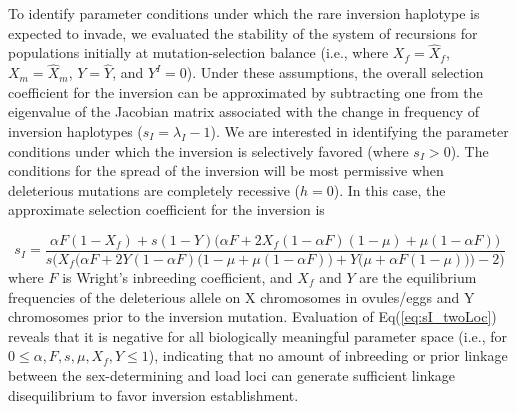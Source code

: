\documentclass{article}
\begin{document}
\begin{appendices}
To identify parameter conditions under which the rare inversion haplotype is expected to invade, we evaluated the stability of the system of recursions for populations initially at mutation-selection balance (i.e., where $X_f=\hat{X}_f$, $X_m=\hat{X}_m$, $Y=\hat{Y}$, and $Y^I=0$). Under these assumptions, the overall selection coefficient for the inversion can be approximated by subtracting one from the eigenvalue of the Jacobian matrix associated with the change in frequency of inversion haplotypes ($s_I = \lambda_I - 1$). We are interested in identifying the parameter conditions under which the inversion is selectively favored (where $s_I > 0$). The conditions for the spread of the inversion will be most permissive when deleterious mutations are completely recessive ($h = 0$). In this case, the approximate selection coefficient for the inversion is

\begin{equation} \label{eq:sI_twoLoc}
	s_I = \frac{\alpha F (1 - X_f) + s(1 - Y) \big( \alpha F + 2 X_f(1 - \alpha F)(1 - \mu) + \mu(1 - \alpha F) \big)} {s \bigg(X_f \Big(\alpha F + 2 Y (1-\alpha F) \big(1 - \mu + \mu (1-\alpha F) \big) + Y \big(\mu+\alpha F(1-\mu) \big) \Big)-2 \bigg)}
\end{equation}
where $F$ is Wright's inbreeding coefficient, and $X_f$ and $Y$ are the equilibrium frequencies of the deleterious allele on X chromosomes in ovules/eggs and Y chromosomes prior to the inversion mutation. Evaluation of Eq(\ref{eq:sI_twoLoc}) reveals that it is negative for all biologically meaningful parameter space (i.e., for $0 \leq  \alpha,F,s,\mu,X_f,Y \leq 1$), indicating that no amount of inbreeding or prior linkage between the sex-determining and load loci can generate sufficient linkage disequilibrium to favor inversion establishment.








\newpage

\end{appendices}
\end{document}
